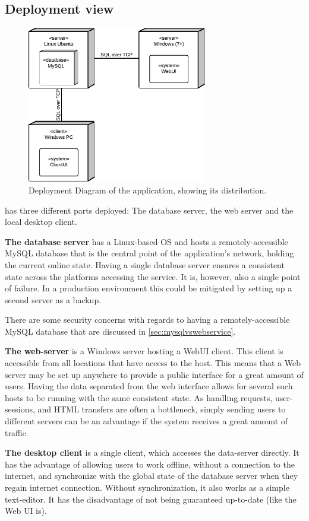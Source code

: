 \subsection{Deployment view}
\label{sec:deployment}

\begin{figure}[htb]
	\centering
	\includegraphics[width=0.7\textwidth]{Software_architecture/graphics/deployment-diag.png}
	\caption{Deployment Diagram of the application, showing its distribution.}
	\label{fig:deployment-diag}
\end{figure}

\SOP{} has three different parts deployed: The database server, the web server and the local
desktop client.

{\bf The database server} has a Linux-based OS and hosts a remotely-accessible MySQL database
that is the central point of the application's network, holding the current online state. Having
a single database server ensures a consistent state across the platforms accessing the service.
It is, however, also a single point of failure. In a production environment this could be mitigated
by setting up a second server as a backup.

There are some security concerns with regards to having a remotely-accessible MySQL database that are
discussed in \ref{sec:mysqlvswebservice}.

{\bf The web-server} is a Windows server hosting a WebUI client. This client is accessible from all
locations that have access to the host. This means that a Web server may be set up anywhere to provide
a public interface for a great amount of users. Having the data separated from the web interface allows
for several such hosts to be running with the same consistent state. As handling requests, user-sessions,
and HTML transfers are often a bottleneck, simply sending users to different servers can be an advantage if the system receives a great
amount of traffic.

{\bf The desktop client} is a single client, which accesses the data-server directly. It has the advantage
of allowing users to work offline, without a connection to the internet, and synchronize with the global
state of the database server when they regain internet connection. Without synchronization, it also works
as a simple text-editor. It has the disadvantage of not being guaranteed up-to-date (like the Web UI is).
